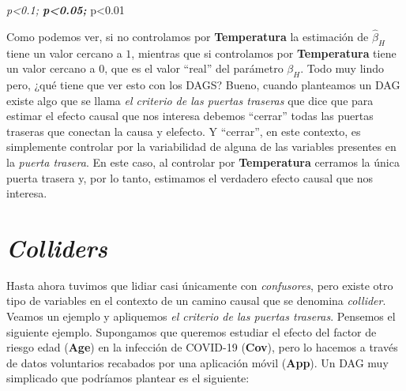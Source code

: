 \documentclass[
  letterpaper,
  DIV=11,
  numbers=noendperiod,
  oneside]{scrreprt}
\begin{document}
\begin{table}
\begin{minipage}[t]{\linewidth}
{\emph{p\textless0.1; \textbf{p\textless0.05; }}p\textless0.01

}

\end{minipage}%
\newline
\begin{minipage}[t]{\linewidth}

{\centering 

}

\end{minipage}%
\newline
\begin{minipage}[t]{\linewidth}

{\centering 

}

\end{minipage}%
\newline
\begin{minipage}[t]{\linewidth}

{\centering 

}

\end{minipage}%

\end{table}

Como podemos ver, si no controlamos por \textbf{Temperatura} la
estimación de \(\hat\beta_H\) tiene un valor cercano a \(1\), mientras
que si controlamos por \textbf{Temperatura} tiene un valor cercano a
\(0\), que es el valor ``real'' del parámetro \(\beta_H\). Todo muy
lindo pero, ¿qué tiene que ver esto con los DAGS? Bueno, cuando
planteamos un DAG existe algo que se llama \emph{el criterio de las
puertas traseras} que dice que para estimar el efecto causal que nos
interesa debemos ``cerrar'' todas las puertas traseras que conectan la
causa y elefecto. Y ``cerrar'', en este contexto, es simplemente
controlar por la variabilidad de alguna de las variables presentes en la
\emph{puerta trasera}. En este caso, al controlar por
\textbf{Temperatura} cerramos la única puerta trasera y, por lo tanto,
estimamos el verdadero efecto causal que nos interesa.

\hypertarget{colliders}{%
\section{\texorpdfstring{\emph{Colliders}}{Colliders}}\label{colliders}}

Hasta ahora tuvimos que lidiar casi únicamente con \emph{confusores},
pero existe otro tipo de variables en el contexto de un camino causal
que se denomina \emph{collider}. Veamos un ejemplo y apliquemos \emph{el
criterio de las puertas traseras}. Pensemos el siguiente ejemplo.
Supongamos que queremos estudiar el efecto del factor de riesgo edad
(\textbf{Age}) en la infección de COVID-19 (\textbf{Cov}), pero lo
hacemos a través de datos voluntarios recabados por una aplicación móvil
(\textbf{App}). Un DAG muy simplicado que podríamos plantear es el
siguiente:
\end{document}
